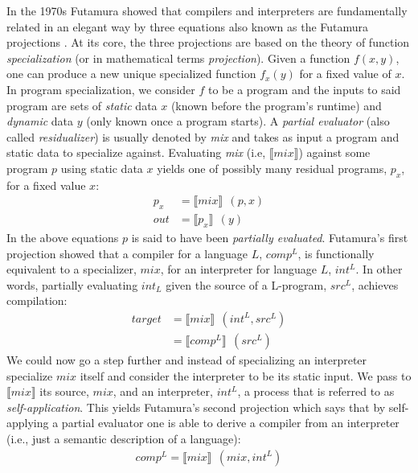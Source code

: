 \documentclass[a4paper,12pt,twoside,openright]{report}
\theoremstyle{definition}
\begin{document}

In the 1970s Futamura showed that compilers and interpreters are fundamentally related in  an elegant way by three equations also known as the Futamura projections \cite{futamura1999partial}. At its core, the three projections are based on the theory of function \textit{specialization} (or in mathematical terms \textit{projection}). Given a function $f(x,y)$, one can produce a new unique specialized function $f_{x}(y)$ for a fixed value of $x$. In program specialization, we consider $f$ to be a program and the inputs to said program are sets of \textit{static} data $x$ (known before the program's runtime) and \textit{dynamic} data $y$ (only known once a program starts). A \textit{partial evaluator} (also called \textit{residualizer}) is usually denoted by \textit{mix} and takes as input a program and static data to specialize against. Evaluating \textit{mix} (i.e, $\llbracket \mathit{mix} \rrbracket$) against some program $p$ using static data $x$ yields one of possibly many residual programs, $p_x$, for a fixed value $x$:
\begin{align*}
    p_{x} & = \llbracket mix \rrbracket \:\: (p, x) \\
    out & = \llbracket p_{x} \rrbracket \:\: (y)
\end{align*}
In the above equations $p$ is said to have been \textit{partially evaluated}. Futamura's first projection showed that a compiler for a language $L$, $comp^{L}$, is functionally equivalent to a specializer, $mix$, for an interpreter for language $L$, $int^{L}$. In other words, partially evaluating $int_{L}$ given the source of a L-program, $src^{L}$, achieves compilation:
\begin{align*}
    target & = \llbracket mix \rrbracket \:\: (int^{L}, src^{L}) \\
           & = \llbracket comp^{L} \rrbracket \:\: (src^{L})
\end{align*}
We could now go a step further and instead of specializing an interpreter specialize $mix$ itself and consider the interpreter to be its static input. We pass to $\llbracket \mathit{mix} \rrbracket$ its source, $mix$, and an interpreter, $int^L$, a process that is referred to as \textit{self-application}. This yields Futamura's second projection which says that by self-applying a partial evaluator one is able to derive a compiler from an interpreter (i.e., just a semantic description of a language):
\begin{align*}
    comp^{L} = \llbracket mix \rrbracket \:\: (mix, int^{L})
\end{align*}
\end{document}
